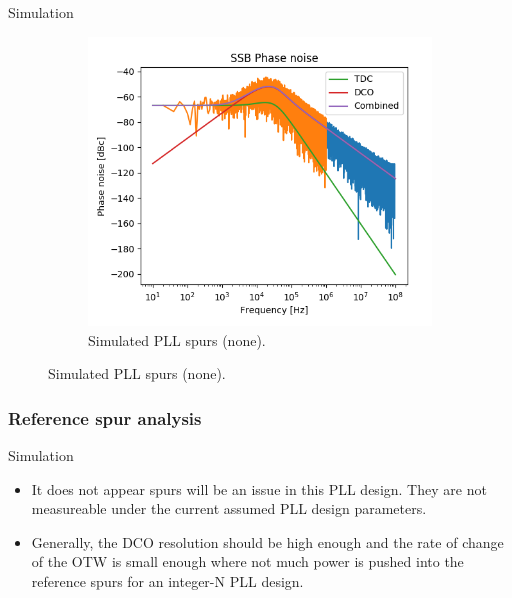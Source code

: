 \documentclass[t, screen, aspectratio=43]{beamer}
\begin{document}
\begin{frame}
\begin{block}{Simulation}
\begin{figure}[htb!]
\begin{subfigure}{.4\textwidth}
	            \includegraphics[width=0.9\linewidth]{stitched_pn.png}
	            \caption{\scriptsize Simulated PLL spurs (none).}
	            \label{fig:rosc_3stg_wave}
	        \end{subfigure}
	        \label{fig:rosc_3stg}
	    \end{figure}
	\end{block}
\end{frame}

\begin{frame}
	\frametitle{Reference spur analysis}
	\vspace{-0.7em}
	\begin{block}{Simulation}
		\begin{itemize}
			\scriptsize
			\item It does not appear spurs will be an issue in this PLL design. They are not measureable under the current assumed PLL design parameters.
			\item Generally, the DCO resolution should be high enough and the rate of change of the OTW is small enough where not much power is pushed into the reference spurs for an integer-N PLL design.
		\end{itemize} 
	\end{block}
\end{frame}
\end{document}
